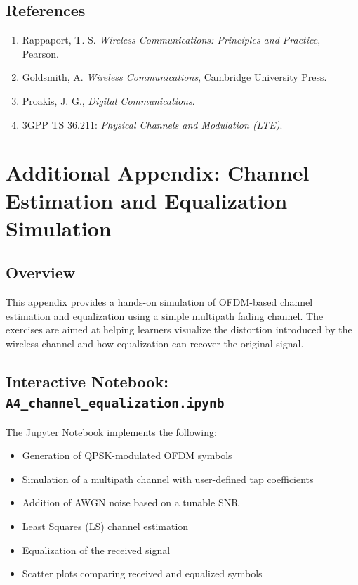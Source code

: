 \subsection*{References}
\begin{enumerate}
    \item Rappaport, T. S. \textit{Wireless Communications: Principles and Practice}, Pearson.
    \item Goldsmith, A. \textit{Wireless Communications}, Cambridge University Press.
    \item Proakis, J. G., \textit{Digital Communications}.
    \item 3GPP TS 36.211: \textit{Physical Channels and Modulation (LTE)}.
\end{enumerate}



\section{Additional Appendix: Channel Estimation and Equalization Simulation}

\subsection{Overview}

This appendix provides a hands-on simulation of OFDM-based channel estimation and equalization using a simple multipath fading channel. The exercises are aimed at helping learners visualize the distortion introduced by the wireless channel and how equalization can recover the original signal.

\subsection{Interactive Notebook: \texttt{A4\_channel\_equalization.ipynb}}

The Jupyter Notebook implements the following:
\begin{itemize}
  \item Generation of QPSK-modulated OFDM symbols
  \item Simulation of a multipath channel with user-defined tap coefficients
  \item Addition of AWGN noise based on a tunable SNR
  \item Least Squares (LS) channel estimation
  \item Equalization of the received signal
  \item Scatter plots comparing received and equalized symbols
\end{itemize}

